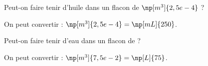 
\hauteurLargeurCadreReponse		{8mm}{2cm}
\initialisationEntrainement

\debutEntrainement


\begin{enonce}
Peut-on faire tenir  d’huile dans un flacon de $\np[m^3]{2,5e-4}$ ?
\end{enonce}


\begin{corrige}
On peut convertir : $\np[m^3]{2,5e-4} = \np[mL]{250}$.
\end{corrige}




\begin{enonce}
Peut-on faire tenir  d'eau dans un flacon de  ?
\end{enonce}


\begin{corrige}
On peut convertir : $ \np[m^3]{7,5e-2} =  \np[L]{75}$.
\end{corrige}



\finEntrainement




